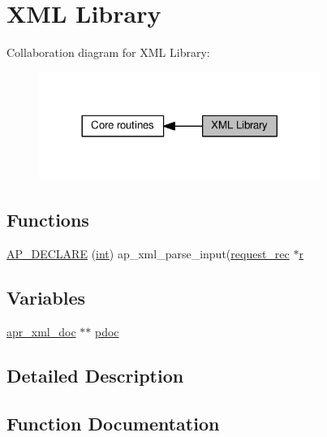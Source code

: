 \hypertarget{group__APACHE__CORE__XML}{}\section{X\+ML Library}
\label{group__APACHE__CORE__XML}
Collaboration diagram for X\+ML Library\+:
\nopagebreak
\begin{figure}[H]
\begin{center}
\leavevmode
\includegraphics[width=260pt]{group__APACHE__CORE__XML}
\end{center}
\end{figure}
\subsection*{Functions}
\begin{DoxyCompactItemize}
\item 
\hyperlink{group__APACHE__CORE__XML_gaf08dc3fe7102420eece811d847f0b384}{A\+P\+\_\+\+D\+E\+C\+L\+A\+RE} (\hyperlink{pcre_8txt_a42dfa4ff673c82d8efe7144098fbc198}{int}) ap\+\_\+xml\+\_\+parse\+\_\+input(\hyperlink{structrequest__rec}{request\+\_\+rec} $\ast$\hyperlink{pcregrep_8txt_a2e9e9438b26c0bb4425367a7e4f75eb3}{r}
\end{DoxyCompactItemize}
\subsection*{Variables}
\begin{DoxyCompactItemize}
\item 
\hyperlink{structapr__xml__doc}{apr\+\_\+xml\+\_\+doc} $\ast$$\ast$ \hyperlink{group__APACHE__CORE__XML_gad270a53cb15625305f196ee848a7ef4e}{pdoc}
\end{DoxyCompactItemize}


\subsection{Detailed Description}


\subsection{Function Documentation}
